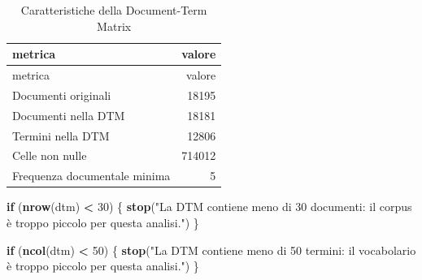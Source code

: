 \documentclass[
]{article}
\newenvironment{Shaded}{\begin{snugshade}}{\end{snugshade}}
\newcommand{\AttributeTok}[1]{\textcolor[rgb]{0.13,0.29,0.53}{#1}}
\newcommand{\ControlFlowTok}[1]{\textcolor[rgb]{0.13,0.29,0.53}{\textbf{#1}}}
\newcommand{\DecValTok}[1]{\textcolor[rgb]{0.00,0.00,0.81}{#1}}
\newcommand{\FunctionTok}[1]{\textcolor[rgb]{0.13,0.29,0.53}{\textbf{#1}}}
\newcommand{\NormalTok}[1]{#1}
\newcommand{\OtherTok}[1]{\textcolor[rgb]{0.56,0.35,0.01}{#1}}
\newcommand{\SpecialCharTok}[1]{\textcolor[rgb]{0.81,0.36,0.00}{\textbf{#1}}}
\newcommand{\StringTok}[1]{\textcolor[rgb]{0.31,0.60,0.02}{#1}}
\begin{document}
\begin{Shaded}
\end{Shaded}

\begin{longtable}[]{@{}lr@{}}
\caption{Caratteristiche della Document-Term Matrix}\tabularnewline
\toprule\noalign{}
metrica & valore \\
\midrule\noalign{}
\endfirsthead
\toprule\noalign{}
metrica & valore \\
\midrule\noalign{}
\endhead
\bottomrule\noalign{}
\endlastfoot
Documenti originali & 18195 \\
Documenti nella DTM & 18181 \\
Termini nella DTM & 12806 \\
Celle non nulle & 714012 \\
Frequenza documentale minima & 5 \\
\end{longtable}

\begin{Shaded}
\begin{Highlighting}[]
\ControlFlowTok{if}\NormalTok{ (}\FunctionTok{nrow}\NormalTok{(dtm) }\SpecialCharTok{\textless{}} \DecValTok{30}\NormalTok{) \{}
  \FunctionTok{stop}\NormalTok{(}\StringTok{"La DTM contiene meno di 30 documenti: il corpus è troppo piccolo per questa analisi."}\NormalTok{)}
\NormalTok{\}}

\ControlFlowTok{if}\NormalTok{ (}\FunctionTok{ncol}\NormalTok{(dtm) }\SpecialCharTok{\textless{}} \DecValTok{50}\NormalTok{) \{}
  \FunctionTok{stop}\NormalTok{(}\StringTok{"La DTM contiene meno di 50 termini: il vocabolario è troppo piccolo per questa analisi."}\NormalTok{)}
\NormalTok{\}}
\end{Highlighting}
\end{Shaded}
\end{document}

